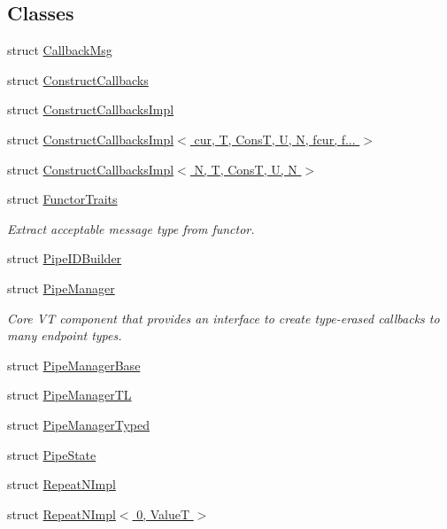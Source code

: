 \subsection*{Classes}
\begin{DoxyCompactItemize}
\item 
struct \hyperlink{structvt_1_1pipe_1_1_callback_msg}{Callback\+Msg}
\item 
struct \hyperlink{structvt_1_1pipe_1_1_construct_callbacks}{Construct\+Callbacks}
\item 
struct \hyperlink{structvt_1_1pipe_1_1_construct_callbacks_impl}{Construct\+Callbacks\+Impl}
\item 
struct \hyperlink{structvt_1_1pipe_1_1_construct_callbacks_impl_3_01cur_00_01_t_00_01_cons_t_00_01_u_00_01_n_00_01fcur_00_01f_8_8_8_01_4}{Construct\+Callbacks\+Impl$<$ cur, T, Cons\+T, U, N, fcur, f... $>$}
\item 
struct \hyperlink{structvt_1_1pipe_1_1_construct_callbacks_impl_3_01_n_00_01_t_00_01_cons_t_00_01_u_00_01_n_01_4}{Construct\+Callbacks\+Impl$<$ N, T, Cons\+T, U, N $>$}
\item 
struct \hyperlink{structvt_1_1pipe_1_1_functor_traits}{Functor\+Traits}
\begin{DoxyCompactList}\small\item\em Extract acceptable message type from functor. \end{DoxyCompactList}\item 
struct \hyperlink{structvt_1_1pipe_1_1_pipe_i_d_builder}{Pipe\+I\+D\+Builder}
\item 
struct \hyperlink{structvt_1_1pipe_1_1_pipe_manager}{Pipe\+Manager}
\begin{DoxyCompactList}\small\item\em Core VT component that provides an interface to create type-\/erased callbacks to many endpoint types. \end{DoxyCompactList}\item 
struct \hyperlink{structvt_1_1pipe_1_1_pipe_manager_base}{Pipe\+Manager\+Base}
\item 
struct \hyperlink{structvt_1_1pipe_1_1_pipe_manager_t_l}{Pipe\+Manager\+TL}
\item 
struct \hyperlink{structvt_1_1pipe_1_1_pipe_manager_typed}{Pipe\+Manager\+Typed}
\item 
struct \hyperlink{structvt_1_1pipe_1_1_pipe_state}{Pipe\+State}
\item 
struct \hyperlink{structvt_1_1pipe_1_1_repeat_n_impl}{Repeat\+N\+Impl}
\item 
struct \hyperlink{structvt_1_1pipe_1_1_repeat_n_impl_3_010_00_01_value_t_01_4}{Repeat\+N\+Impl$<$ 0, Value\+T $>$}
\end{DoxyCompactItemize}
